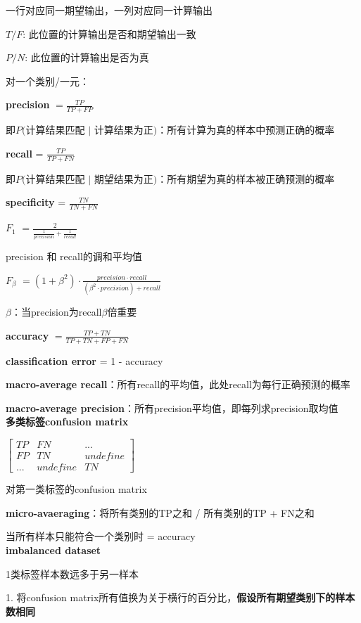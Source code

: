 \documentclass[UTF8]{ctexart}
\begin{document}
  一行对应同一期望输出，一列对应同一计算输出

  $T/F$: 此位置的计算输出是否和期望输出一致

  $P/N$: 此位置的计算输出是否为真

  对一个类别/一元：

  \quad \textbf{precision} $= \frac{TP}{TP + FP}$

  \quad \quad 即$P($计算结果匹配 $|$ 计算结果为正$)$：所有计算为真的样本中预测正确的概率

  \quad \textbf{recall} = $\frac{TP}{TP + FN}$

  \quad \quad 即$P($计算结果匹配 $|$ 期望结果为正$)$：所有期望为真的样本被正确预测的概率

  \quad \textbf{specificity} = $\frac{TN}{TN + FN}$

  \quad \textbf{$F_1$} $= \frac{2}{\frac{1}{precision} + \frac{1}{recall}}$ 
  
  \quad \quad precision 和 recall的调和平均值

  \quad \textbf{$F_\beta$} $= (1 + \beta^2) \cdot \frac{precision \cdot recall}{(\beta^2 \cdot precision) + recall}$

  \quad \quad $\beta$：当precision为recall$\beta$倍重要

  \textbf{accuracy} $= \frac{TP + TN}{TP + TN + FP + FN}$

  \textbf{classification error} = 1 - accuracy
  
  \textbf{macro-average recall}：所有recall的平均值，此处recall为每行正确预测的概率

  \textbf{macro-average precision}：所有precision平均值，即每列求precision取均值\\
\textbf{多类标签confusion matrix}

  $\begin{bmatrix}
    TP & FN & ... \\
    FP & TN & undefine\\
    ... & undefine & TN
  \end{bmatrix}$
  
  对第一类标签的confusion matrix
  
  \textbf{micro-avaeraging}：将所有类别的TP之和 / 所有类别的TP + FN之和
  
  \quad 当所有样本只能符合一个类别时 = accuracy\\
\textbf{imbalanced dataset}

  1类标签样本数远多于另一样本
  
  1. 将confusion matrix所有值换为关于横行的百分比，\textbf{假设所有期望类别下的样本数相同}
  
\end{document}
